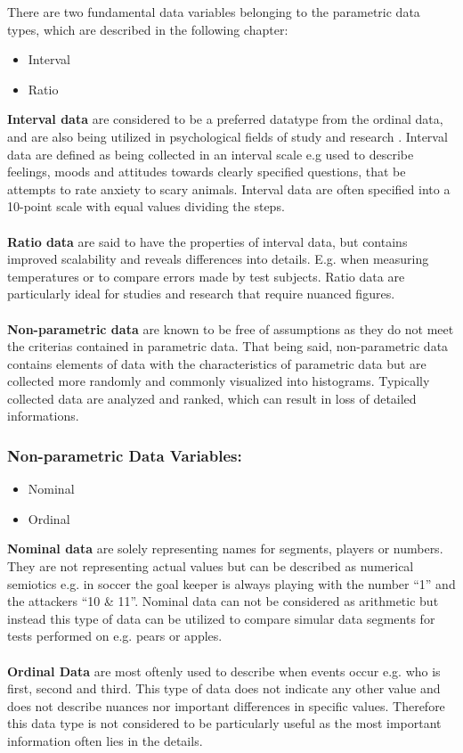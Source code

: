 There are two fundamental data variables belonging to the parametric data types, which are described in the following chapter:
\begin{itemize}
\item Interval
\item Ratio 
\end{itemize}
\textbf{Interval data} are considered to be a preferred datatype from the ordinal data, and are also being utilized in psychological fields of study and research \citep[page 8]{Design}. Interval data are defined as being collected in an interval scale e.g used to describe feelings, moods and attitudes towards clearly specified questions, that be attempts to rate anxiety to scary animals. Interval data are often specified into a 10-point scale with equal values dividing the steps.\\\\
\textbf{Ratio data} are said to have the properties of interval data, but contains improved scalability and reveals differences into details. E.g. when measuring temperatures or to compare errors made by test subjects. Ratio data are particularly ideal for studies and research that require nuanced figures.\\\\
\textbf{Non-parametric data} are known to be free of assumptions as they do not meet the criterias contained in parametric data. That being said, non-parametric data contains elements of data with the characteristics of parametric data but are collected more randomly and commonly visualized into histograms. Typically collected data are analyzed and ranked, which can result in loss of detailed informations. 
\subsubsection{Non-parametric Data Variables:}
\begin{itemize}
\item Nominal
\item Ordinal
\end{itemize}
\textbf{Nominal data} are solely representing names for segments, players or numbers. They are not representing actual values but can be described as numerical semiotics e.g. in soccer the goal keeper is always playing with the number “1” and the attackers “10 \& 11”. Nominal data can not be considered as arithmetic but instead this type of data can be utilized to compare simular data segments for tests performed on e.g. pears or apples.\\\\
\textbf{Ordinal Data} are most oftenly used to describe when events occur e.g. who is first, second and third. This type of data does not indicate any other value and does not describe nuances nor important differences in specific values. Therefore this data type is not considered to be particularly useful as the most important information often lies in the details. 
